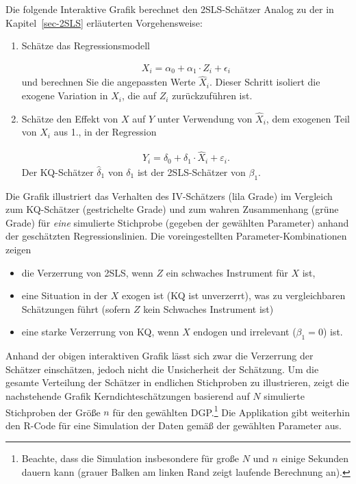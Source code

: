 \documentclass[
  a4paper,
  DIV=11,
  oneside]{scrreprt}
\providecommand{\tightlist}{%
  \setlength{\itemsep}{0pt}\setlength{\parskip}{0pt}}\usepackage{longtable,booktabs,array}
\begin{document}
Die folgende Interaktive Grafik berechnet den 2SLS-Schätzer Analog zu
der in Kapitel~\ref{sec-2SLS} erläuterten Vorgehensweise:

\begin{enumerate}
\def\labelenumi{\arabic{enumi}.}
\item
  Schätze das Regressionsmodell

  \begin{align}
   X_i = \alpha_0 + \alpha_1 \cdot Z_i + \epsilon_i
   \end{align} und berechnen Sie die angepassten Werte
  \(\widehat{X}_i\). Dieser Schritt isoliert die exogene Variation in
  \(X_i\), die auf \(Z_i\) zurückzuführen ist.
\item
  Schätze den Effekt von \(X\) auf \(Y\) unter Verwendung von
  \(\widehat{X}_i\), dem exogenen Teil von \(X_i\) aus 1., in der
  Regression

  \begin{align}
   Y_i = \delta_0 + \delta_1 \cdot \widehat{X}_i  + \varepsilon_i.
   \end{align} Der KQ-Schätzer \(\widehat{\delta}_1\) von \(\delta_1\)
  ist der 2SLS-Schätzer von \(\beta_1\).
\end{enumerate}

Die Grafik illustriert das Verhalten des IV-Schätzers (lila Grade) im
Vergleich zum KQ-Schätzer (gestrichelte Grade) und zum wahren
Zusammenhang (grüne Grade) für \emph{eine} simulierte Stichprobe
(gegeben der gewählten Parameter) anhand der geschätzten
Regressionslinien. Die voreingestellten Parameter-Kombinationen zeigen

\begin{itemize}
\tightlist
\item
  die Verzerrung von 2SLS, wenn \(Z\) ein schwaches Instrument für \(X\)
  ist,
\item
  eine Situation in der \(X\) exogen ist (KQ ist unverzerrt), was zu
  vergleichbaren Schätzungen führt (sofern \(Z\) kein Schwaches
  Instrument ist)
\item
  eine starke Verzerrung von KQ, wenn \(X\) endogen und irrelevant
  (\(\beta_1 = 0\)) ist.
\end{itemize}

Anhand der obigen interaktiven Grafik lässt sich zwar die Verzerrung der
Schätzer einschätzen, jedoch nicht die Unsicherheit der Schätzung. Um
die gesamte Verteilung der Schätzer in endlichen Stichproben zu
illustrieren, zeigt die nachstehende Grafik Kerndichteschätzungen
basierend auf \(N\) simulierte Stichproben der Größe \(n\) für den
gewählten DGP.\footnote{Beachte, dass die Simulation insbesondere für
  große \(N\) und \(n\) einige Sekunden dauern kann (grauer Balken am
  linken Rand zeigt laufende Berechnung an).} Die Applikation gibt
weiterhin den R-Code für eine Simulation der Daten gemäß der gewählten
Parameter aus.
\end{document}
